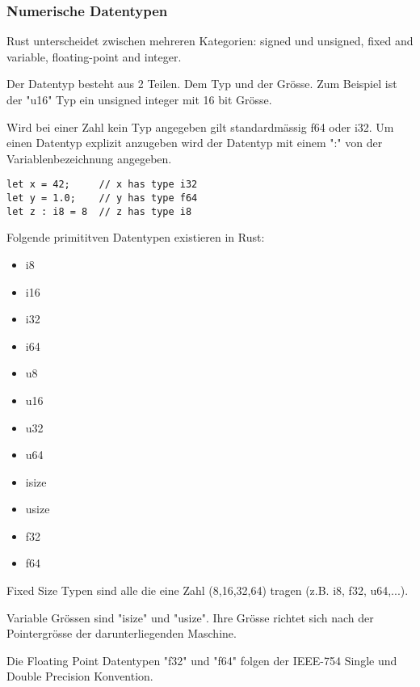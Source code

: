 \subsubsection{Numerische Datentypen}
Rust unterscheidet zwischen mehreren Kategorien: signed und unsigned, fixed and variable, floating-point and integer.

Der Datentyp besteht aus 2 Teilen. Dem Typ und der Grösse.
Zum Beispiel ist der "u16" Typ ein unsigned integer mit 16 bit Grösse.

Wird bei einer Zahl kein Typ angegeben gilt standardmässig f64 oder i32. Um einen Datentyp explizit anzugeben wird der Datentyp mit einem ":" von der Variablenbezeichnung angegeben.

\begin{lstlisting}
let x = 42; 	// x has type i32
let y = 1.0; 	// y has type f64
let z : i8 = 8 	// z has type i8
\end{lstlisting}

Folgende primititven Datentypen existieren in Rust: 
\begin{itemize}
\item i8
\item i16
\item i32
\item i64
\item u8
\item u16
\item u32
\item u64
\item isize
\item usize
\item f32
\item f64
\end{itemize}

Fixed Size Typen sind alle die eine Zahl (8,16,32,64) tragen (z.B. i8, f32, u64,...).

Variable Grössen sind "isize" und "usize". Ihre Grösse richtet sich nach der Pointergrösse der darunterliegenden Maschine.

Die Floating Point Datentypen "f32" und "f64" folgen der  IEEE-754 Single und Double Precision Konvention.